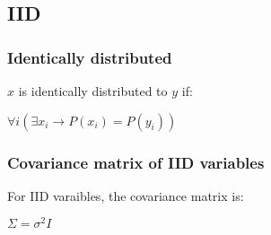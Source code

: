 
\subsection{IID}

\subsubsection{Identically distributed}

\(x\) is identically distributed to \(y\) if:

$\forall i (\exists x_i \rightarrow P(x_i)=P(y_i))$

\subsubsection{Covariance matrix of IID variables}

For IID varaibles, the covariance  matrix is:

\(\Sigma = \sigma^2 I\)

